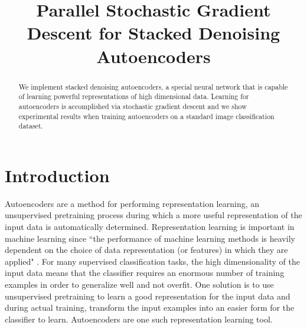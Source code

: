\documentclass[conference]{IEEEtran}
\begin{document}
\title{Parallel Stochastic Gradient Descent for Stacked Denoising Autoencoders}

\author{
\and
{}
}

\maketitle

\begin{abstract}
We implement stacked denoising autoencoders, a special neural network that is capable of learning powerful representations of high dimensional data. Learning for autoencoders is accomplished via stochastic gradient descent and we show experimental results when training autoencoders on a standard image classification dataset. 
\end{abstract}

\section{Introduction}
Autoencoders are a method for performing representation learning, an unsupervised pretraining process during which a more useful representation of the
input data is automatically determined. Representation learning is important in machine learning since ``the performance of 
machine learning methods is heavily dependent on the choice of data representation (or features) in which they are applied" 
\cite{bengio2012rep}. For many supervised classification tasks, the high dimensionality of the input data means that the classifier requires an enormous number of training examples in order to generalize well and not overfit. One solution is to use unsupervised pretraining to learn a good representation for the input data and during actual training, transform the input examples into an easier form for the classifier to learn. Autoencoders are one such representation learning tool.
\end{document}
